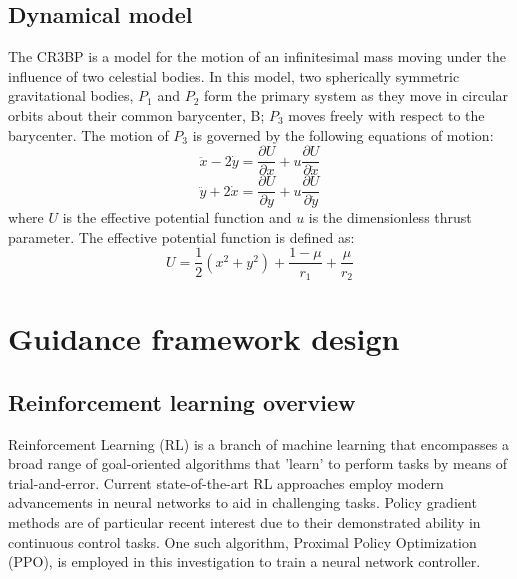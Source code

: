 \documentclass[conference]{IEEEtran}
\begin{document}
\subsection{Dynamical model}

The CR3BP is a model for the motion of an infinitesimal mass moving under the influence of two celestial bodies. In this model, two spherically symmetric gravitational bodies, \(P_1\) and \(P_2\) form the primary system as they move in circular orbits about their common barycenter, B; \(P_3\) moves freely with respect to the barycenter. The motion of \(P_3\) is governed by the following equations of motion:
\begin{equation}
    \ddot{x} - 2\dot{y} = \frac{\partial U}{\partial x} + u\frac{\partial U}{\partial \dot{x}}
\end{equation}
\begin{equation}
    \ddot{y} + 2\dot{x} = \frac{\partial U}{\partial y} + u\frac{\partial U}{\partial \dot{y}}
\end{equation}
where \(U\) is the effective potential function and \(u\) is the dimensionless thrust parameter. The effective potential function is defined as:
\begin{equation}
    U = \frac{1}{2}(x^2 + y^2) + \frac{1 - \mu}{r_1} + \frac{\mu}{r_2}
\end{equation}

\section{Guidance framework design}
\subsection{Reinforcement learning overview}
Reinforcement Learning (RL) is a branch of machine learning that encompasses a broad range of goal-oriented algorithms that 'learn' to perform tasks by means of trial-and-error. Current state-of-the-art RL approaches employ modern advancements in neural networks to aid in challenging tasks. Policy gradient methods are of particular recent interest due to their demonstrated ability in continuous control tasks. One such algorithm, Proximal Policy Optimization (PPO), is employed in this investigation to train a neural network controller.
\end{document}
